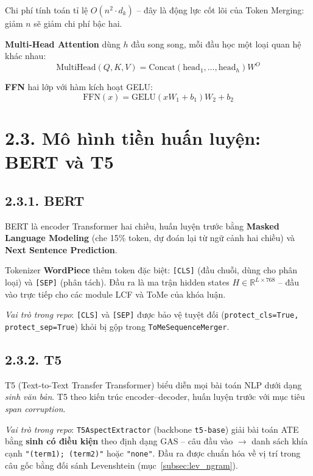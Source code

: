 Chi phí tính toán tỉ lệ $O(n^2 \cdot d_k)$ -- đây là động lực cốt
lõi của Token Merging: giảm $n$ sẽ giảm chi phí bậc hai.

\textbf{Multi-Head Attention} dùng $h$ đầu song song, mỗi đầu học
một loại quan hệ khác nhau:
\begin{equation}
\text{MultiHead}(Q,K,V) = \text{Concat}(\text{head}_1,\ldots,\text{head}_h)W^O
\end{equation}

\textbf{FFN} hai lớp với hàm kích hoạt GELU:
\begin{equation}
\text{FFN}(x) = \text{GELU}(xW_1+b_1)W_2+b_2
\end{equation}

\section{2.3.\; Mô hình tiền huấn luyện: BERT và T5}
\label{sec:plm}

\subsection{2.3.1.\; BERT}
\label{subsec:bert}

BERT \cite{devlin2019bert} là encoder Transformer hai chiều, huấn luyện
trước bằng \textbf{Masked Language Modeling} (che 15\% token, dự đoán
lại từ ngữ cảnh hai chiều) và \textbf{Next Sentence Prediction}.

Tokenizer \textbf{WordPiece} thêm token đặc biệt: \texttt{[CLS]} (đầu
chuỗi, dùng cho phân loại) và \texttt{[SEP]} (phân tách). Đầu ra là
ma trận hidden states $H \in \mathbb{R}^{L \times 768}$ -- đầu vào
trực tiếp cho các module LCF và ToMe của khóa luận.

\noindent\textit{Vai trò trong repo}: \texttt{[CLS]} và \texttt{[SEP]}
được bảo vệ tuyệt đối (\texttt{protect\_cls=True, protect\_sep=True})
khỏi bị gộp trong \texttt{ToMeSequenceMerger}.

\subsection{2.3.2.\; T5}
\label{subsec:t5}

T5 \cite{raffel2020t5} (Text-to-Text Transfer Transformer) biểu diễn
mọi bài toán NLP dưới dạng \emph{sinh văn bản}. T5 theo kiến trúc
encoder--decoder, huấn luyện trước với mục tiêu \textit{span corruption}.

\noindent\textit{Vai trò trong repo}: \texttt{T5AspectExtractor}
(backbone \texttt{t5-base}) giải bài toán ATE bằng \textbf{sinh có điều
kiện} theo định dạng GAS -- câu đầu vào $\to$ danh sách khía cạnh
\texttt{"(term1); (term2)"} hoặc \texttt{"none"}. Đầu ra được chuẩn
hóa về vị trí trong câu gốc bằng đối sánh Levenshtein (mục~\ref{subsec:lev_ngram}).

